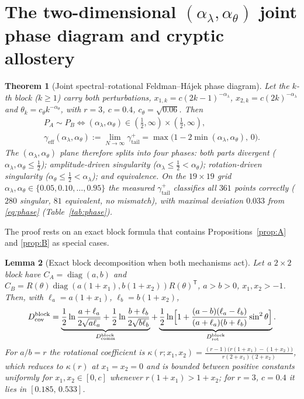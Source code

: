 \documentclass[11pt,reqno]{amsart}
\theoremstyle{plain}
\newtheorem{theorem}{Theorem}[section]
\newtheorem{lemma}[theorem]{Lemma}
\theoremstyle{definition}
\theoremstyle{remark}
\numberwithin{equation}{section}
\DeclareMathOperator{\diag}{diag}
\newcommand{\Dcov}{D_{\mathrm{cov}}}
\newcommand{\Dcomm}{D_{\mathrm{comm}}}
\newcommand{\Drot}{D_{\mathrm{rot}}}
\newcommand{\gtail}{\gamma_{\mathrm{tail}}}
\newcommand{\geff}{\gamma_{\mathrm{eff}}}
\newcommand{\PA}{P_{A}}
\newcommand{\PB}{P_{B}}
\newcommand{\CA}{C_A}
\newcommand{\CB}{C_B}
\begin{document}
\section{The two-dimensional \texorpdfstring{$(\alpha_\lambda,\alpha_\theta)$}{(alpha\_lambda, alpha\_theta)} joint phase diagram and cryptic allostery}
\label{sec:phase}

\begin{theorem}[Joint spectral--rotational Feldman--H\'ajek phase diagram]\label{thm:phase}
Let the $k$-th block ($k\ge1$) carry both perturbations, $x_{1,k}=c(2k-1)^{-\alpha_\lambda}$, $x_{2,k}=c(2k)^{-\alpha_\lambda}$ and $\theta_k=c_\theta k^{-\alpha_\theta}$, with $r=3$, $c=0.4$, $c_\theta=\sqrt{0.06}$. Then
\begin{equation}\label{eq:phase}
\begin{gathered}
\PA\sim\PB\iff(\alpha_\lambda,\alpha_\theta)\in(\tfrac12,\infty)\times(\tfrac12,\infty),\\
\geff(\alpha_\lambda,\alpha_\theta):=\lim_{N\to\infty}\gtail^+=\max\bigl(1-2\min(\alpha_\lambda,\alpha_\theta),\,0\bigr).
\end{gathered}
\end{equation}
The $(\alpha_\lambda,\alpha_\theta)$ plane therefore splits into four phases: both parts divergent ($\alpha_\lambda,\alpha_\theta\le\tfrac12$); amplitude-driven singularity ($\alpha_\lambda\le\tfrac12<\alpha_\theta$); rotation-driven singularity ($\alpha_\theta\le\tfrac12<\alpha_\lambda$); and equivalence. On the $19\times19$ grid $\alpha_\lambda,\alpha_\theta\in\{0.05,0.10,\dots,0.95\}$ the measured $\gtail^+$ classifies all $361$ points correctly ($280$ singular, $81$ equivalent, no mismatch), with maximal deviation $0.033$ from \eqref{eq:phase} (Table~\ref{tab:phase}).
\end{theorem}

The proof rests on an exact block formula that contains Propositions~\ref{prop:A} and \ref{prop:B} as special cases.

\begin{lemma}[Exact block decomposition when both mechanisms act]\label{lem:block}
Let a $2\times2$ block have $\CA=\diag(a,b)$ and $\CB=R(\theta)\diag(a(1+x_1),b(1+x_2))R(\theta)^{\mathsf T}$, $a>b>0$, $x_1,x_2>-1$. Then, with $\ell_a=a(1+x_1)$, $\ell_b=b(1+x_2)$,
\begin{equation}\label{eq:blockexact}
\Dcov^{\mathrm{block}}=\underbrace{\frac12\ln\frac{a+\ell_a}{2\sqrt{a\ell_a}}+\frac12\ln\frac{b+\ell_b}{2\sqrt{b\ell_b}}}_{\Dcomm^{\mathrm{block}}}+\underbrace{\frac12\ln\Bigl[1+\frac{(a-b)(\ell_a-\ell_b)}{(a+\ell_a)(b+\ell_b)}\sin^2\theta\Bigr]}_{\Drot^{\mathrm{block}}} .
\end{equation}
For $a/b=r$ the rotational coefficient is $\kappa(r;x_1,x_2)=\frac{(r-1)\bigl(r(1+x_1)-(1+x_2)\bigr)}{r(2+x_1)(2+x_2)}$, which reduces to $\kappa(r)$ at $x_1=x_2=0$ and is bounded between positive constants uniformly for $x_1,x_2\in[0,c]$ whenever $r(1+x_1)>1+x_2$; for $r=3$, $c=0.4$ it lies in $[0.185,\,0.533]$.
\end{lemma}
\end{document}
